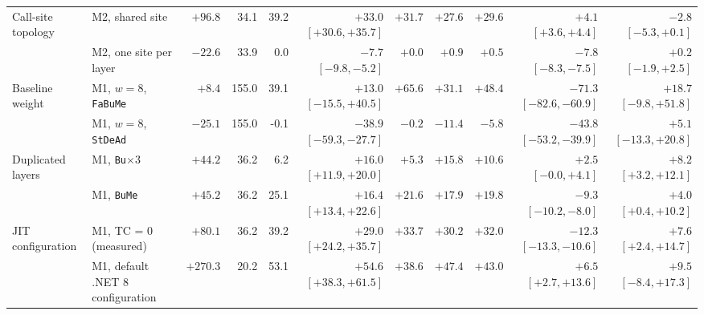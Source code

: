 \begin{table}[t]
{\begin{tabular}{llrrrrrrrrr}
\midrule
Call-site topology & M2, shared site & $+96.8$ & 34.1 & 39.2 & $+33.0$ {\scriptsize$[+30.6, +35.7]$} & $+31.7$ & $+27.6$ & $+29.6$ & $+4.1$ {\scriptsize$[+3.6, +4.4]$} & $-2.8$ {\scriptsize$[-5.3, +0.1]$}\\
 & M2, one site per layer & $-22.6$ & 33.9 & 0.0 & $-7.7$ {\scriptsize$[-9.8, -5.2]$} & $+0.0$ & $+0.9$ & $+0.5$ & $-7.8$ {\scriptsize$[-8.3, -7.5]$} & $+0.2$ {\scriptsize$[-1.9, +2.5]$}\\
\midrule
Baseline weight & M1, $w = 8$, \texttt{FaBuMe} & $+8.4$ & 155.0 & 39.1 & $+13.0$ {\scriptsize$[-15.5, +40.5]$} & $+65.6$ & $+31.1$ & $+48.4$ & $-71.3$ {\scriptsize$[-82.6, -60.9]$} & $+18.7$ {\scriptsize$[-9.8, +51.8]$}\\
 & M1, $w = 8$, \texttt{StDeAd} & $-25.1$ & 155.0 & -0.1 & $-38.9$ {\scriptsize$[-59.3, -27.7]$} & $-0.2$ & $-11.4$ & $-5.8$ & $-43.8$ {\scriptsize$[-53.2, -39.9]$} & $+5.1$ {\scriptsize$[-13.3, +20.8]$}\\
\midrule
Duplicated layers & M1, \texttt{Bu}$\times 3$ & $+44.2$ & 36.2 & 6.2 & $+16.0$ {\scriptsize$[+11.9, +20.0]$} & $+5.3$ & $+15.8$ & $+10.6$ & $+2.5$ {\scriptsize$[-0.0, +4.1]$} & $+8.2$ {\scriptsize$[+3.2, +12.1]$}\\
 & M1, \texttt{BuMe} & $+45.2$ & 36.2 & 25.1 & $+16.4$ {\scriptsize$[+13.4, +22.6]$} & $+21.6$ & $+17.9$ & $+19.8$ & $-9.3$ {\scriptsize$[-10.2, -8.0]$} & $+4.0$ {\scriptsize$[+0.4, +10.2]$}\\
\midrule
JIT configuration & M1, TC = 0 (measured) & $+80.1$ & 36.2 & 39.2 & $+29.0$ {\scriptsize$[+24.2, +35.7]$} & $+33.7$ & $+30.2$ & $+32.0$ & $-12.3$ {\scriptsize$[-13.3, -10.6]$} & $+7.6$ {\scriptsize$[+2.4, +14.7]$}\\
 & M1, default .NET 8 configuration & $+270.3$ & 20.2 & 53.1 & $+54.6$ {\scriptsize$[+38.3, +61.5]$} & $+38.6$ & $+47.4$ & $+43.0$ & $+6.5$ {\scriptsize$[+2.7, +13.6]$} & $+9.5$ {\scriptsize$[-8.4, +17.3]$}\\
\bottomrule
\end{tabular}}
\end{table}
